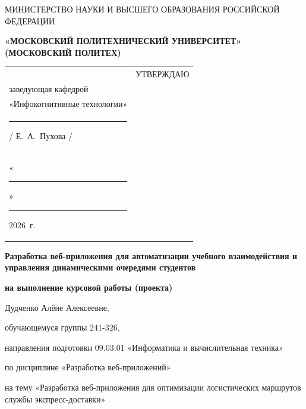 \documentclass[14pt, a4paper]{extarticle}
\begin{document}
\pagestyle{empty}


\begin{center}
    {\small МИНИСТЕРСТВО НАУКИ И ВЫСШЕГО ОБРАЗОВАНИЯ РОССИЙСКОЙ ФЕДЕРАЦИИ}


    {\small \textbf{«МОСКОВСКИЙ ПОЛИТЕХНИЧЕСКИЙ УНИВЕРСИТЕТ»}} \\
    {\small \textbf{(МОСКОВСКИЙ ПОЛИТЕХ)}}
\end{center}

\begin{tabularx}{\textwidth}{@{} p{} p{} @{}}
     &
    \raggedright
    УТВЕРЖДАЮ                          \\
    заведующая кафедрой                \\
    «Инфокогнитивные технологии»       \\[0.3cm]

    \rule{3cm}{0.4pt} / Е.~А.~Пухова / \\[0.1cm]

    «\rule{0.8cm}{0.4pt}» \rule{3cm}{0.4pt} 2026~г.
\end{tabularx}


\begin{center}

    { \large \textbf{Разработка веб-приложения для автоматизации учебного взаимодействия и управления динамическими очередями студентов}}

    \textbf{на выполнение курсовой работы (проекта)}

    Дудченко Алёне Алексеевне, %

\end{center}

обучающемуся группы 241-326,

направления подготовки 09.03.01 «Информатика и вычислительная техника»

по дисциплине «Разработка веб-приложений»

на тему «Разработка веб-приложения для оптимизации логистических
маршрутов службы экспресс-доставки»
\end{document}
